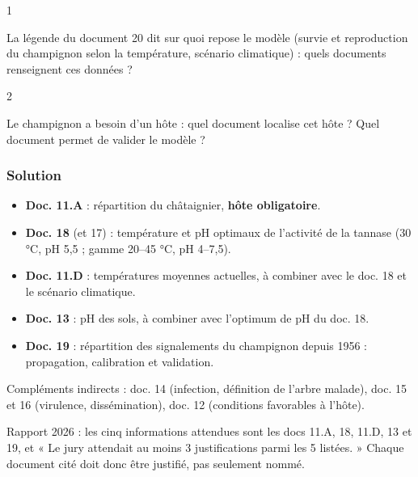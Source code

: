 \documentclass[11pt,a4paper]{article}
\providecommand{\tightlist}{\setlength{\itemsep}{0pt}\setlength{\parskip}{0pt}}
\begin{document}
\begin{indication}{1}

La légende du document 20 dit sur quoi repose le modèle (survie et reproduction du champignon selon la température, scénario climatique) : quels documents renseignent ces données ?

\end{indication}

\begin{indication}{2}

Le champignon a besoin d'un hôte : quel document localise cet hôte ? Quel document permet de valider le modèle ?

\end{indication}

\hypertarget{solution-37}{%
\subsubsection{Solution}\label{solution-37}}

\begin{itemize}
\tightlist
\item
  \textbf{Doc. 11.A} : répartition du châtaignier, \textbf{hôte obligatoire}.
\item
  \textbf{Doc. 18} (et 17) : température et pH optimaux de l'activité de la tannase (30 °C, pH 5,5 ; gamme 20--45 °C, pH 4--7,5).
\item
  \textbf{Doc. 11.D} : températures moyennes actuelles, à combiner avec le doc. 18 et le scénario climatique.
\item
  \textbf{Doc. 13} : pH des sols, à combiner avec l'optimum de pH du doc. 18.
\item
  \textbf{Doc. 19} : répartition des signalements du champignon depuis 1956 : propagation, calibration et validation.
\end{itemize}

Compléments indirects : doc. 14 (infection, définition de l'arbre malade), doc. 15 et 16 (virulence, dissémination), doc. 12 (conditions favorables à l'hôte).

\begin{jury}

Rapport 2026 : les cinq informations attendues sont les docs 11.A, 18, 11.D, 13 et 19, et « Le jury attendait au moins 3 justifications parmi les 5 listées. » Chaque document cité doit donc être justifié, pas seulement nommé.

\end{jury}
\end{document}
